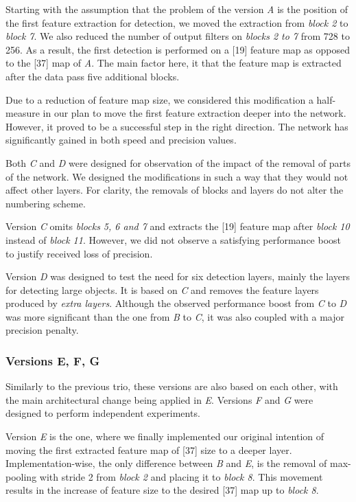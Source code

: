 Starting with the assumption that the problem of the version \textit{A} is the position of the first feature extraction for detection, we moved the extraction from \textit{block 2} to \textit{block 7}. We also reduced the number of output filters on \textit{blocks 2 to 7} from 728 to 256. As a result, the first detection is performed on a [19] feature map as opposed to the [37] map of \textit{A}. The main factor here, it that the feature map is extracted after the data pass five additional blocks. 

Due to a reduction of feature map size, we considered this modification a half-measure in our plan to move the first feature extraction deeper into the network. However, it proved to be a successful step in the right direction. The network has significantly gained in both speed and precision values. 

Both \textit{C} and \textit{D} were designed for observation of the impact of the removal of parts of the network. We designed the modifications in such a way that they would not affect other layers. For clarity, the removals of blocks and layers do not alter the numbering scheme.

Version \textit{C} omits \textit{blocks 5, 6 and 7} and extracts the [19] feature map after \textit{block 10} instead of \textit{block 11}. However, we did not observe a satisfying performance boost to justify received loss of precision. 

Version \textit{D} was designed to test the need for six detection layers, mainly the layers for detecting large objects. It is based on \textit{C} and removes the feature layers produced by \textit{extra layers}. Although the observed performance boost from \textit{C} to \textit{D} was more significant than the one from \textit{B} to \textit{C},  it was also coupled with a major precision penalty.

\subsubsection{Versions E, F, G}
Similarly to the previous trio, these versions are also based on each other, with the main architectural change being applied in \textit{E}. Versions \textit{F} and \textit{G} were designed to perform independent experiments. 

Version \textit{E} is the one, where we finally implemented our original intention of moving the first extracted feature map of [37] size to a deeper layer. Implementation-wise, the only difference between \textit{B} and \textit{E}, is the removal of max-pooling with stride 2 from \textit{block 2} and placing it to \textit{block 8}. This movement results in the increase of feature size to the desired [37] map up to \textit{block 8}.

